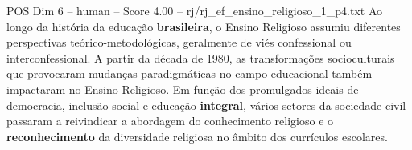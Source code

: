 \begin{textsample}{POS Dim 6 – human – Score 4.00 – rj/rj\_ef\_ensino\_religioso\_1\_p4.txt}  \label{ex:f6_pos_006}
Ao longo da história da educação \textbf{brasileira}, o Ensino Religioso assumiu diferentes perspectivas teórico-metodológicas, geralmente de viés confessional ou interconfessional.
A partir da década de 1980, as transformações socioculturais que provocaram mudanças paradigmáticas no campo educacional também impactaram no Ensino Religioso.
Em função dos promulgados ideais de democracia, inclusão social e educação \textbf{integral}, vários setores da sociedade civil passaram a reivindicar a abordagem do conhecimento religioso e o \textbf{reconhecimento} da diversidade religiosa no âmbito dos currículos escolares.

\end{textsample}

